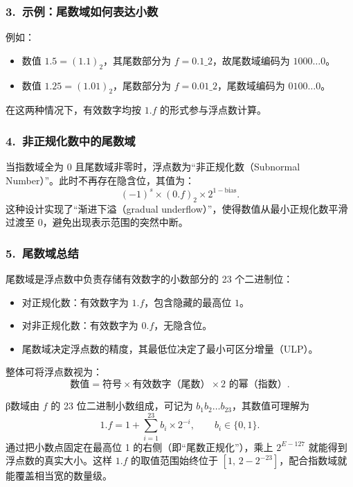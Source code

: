 \subsubsection*{3.\ 示例：尾数域如何表达小数}
例如：
\begin{itemize}
    \item 数值 $1.5 = (1.1)_2$，其尾数部分为 $f = 0.1\_2$，故尾数域编码为 $1000\ldots 0$。
    \item 数值 $1.25 = (1.01)_2$，尾数部分为 $f = 0.01\_2$，尾数域编码为 $0100\ldots 0$。
\end{itemize}
在这两种情况下，有效数字均按 $1.f$ 的形式参与浮点数计算。

\subsubsection*{4.\ 非正规化数中的尾数域}
当指数域全为 $0$ 且尾数域非零时，浮点数为“非正规化数（Subnormal Number）”。此时不再存在隐含位，其值为：
\[
(-1)^s \times (0.f)_2 \times 2^{1-\mathrm{bias}}.
\]
这种设计实现了“渐进下溢（gradual underflow）”，使得数值从最小正规化数平滑过渡至 $0$，避免出现表示范围的突然中断。

\subsubsection*{5.\ 尾数域总结}
尾数域是浮点数中负责存储有效数字的小数部分的 23 个二进制位：
\begin{itemize}
    \item 对正规化数：有效数字为 $1.f$，包含隐藏的最高位 $1$。
    \item 对非正规化数：有效数字为 $0.f$，无隐含位。
    \item 尾数域决定浮点数的精度，其最低位决定了最小可区分增量（ULP）。
\end{itemize}
整体可将浮点数视为：
\[
\text{数值} = \text{符号} \times \text{有效数字（尾数）} \times \text{2 的幂（指数）}.
\]
















β数域由 $f$ 的 23 位二进制小数组成，可记为 $b_1 b_2 \ldots b_{23}$，其数值可理解为
\[
1.f = 1 + \sum_{i=1}^{23} b_i \times 2^{-i}, \qquad b_i \in \{0,1\}.
\]
通过把小数点固定在最高位 1 的右侧（即“尾数正规化”），乘上 $2^{E-127}$ 就能得到浮点数的真实大小。这样
$1.f$ 的取值范围始终位于 $\left[1,\,2-2^{-23}\right]$，配合指数域就能覆盖相当宽的数量级。

